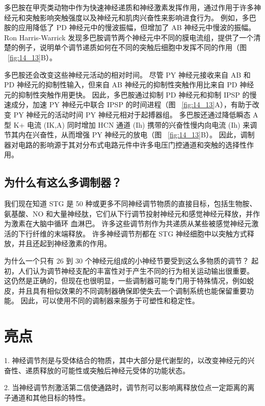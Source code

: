 多巴胺在甲壳类动物中作为快速神经递质和神经激素发挥作用，通过作用于许多神经元和突触影响突触强度以及神经元和肌肉兴奋性来影响进食行为。
例如，多巴胺的应用降低了 PD 神经元中的慢波振幅，但增加了 AB 神经元中慢波的振幅。
Ron Harris-Warrick 发现多巴胺调节两个神经元中不同的膜电流组，提供了一个清楚的例子，说明单个调节递质如何在不同的突触后细胞中发挥不同的作用（图 ~\ref{fig:14_13}B）。


多巴胺还会改变这些神经元活动的相对时间。
尽管 PY 神经元接收来自 AB 和 PD 神经元的抑制性输入，但来自 AB 神经元的抑制性突触作用比来自 PD 神经元的抑制性突触作用更快。
因此，多巴胺通过抑制 PD 神经元和抑制 IPSP 的慢速成分，加速 PY 神经元中联合 IPSP 的时间进程（图 ~\ref{fig:14_13}A），有助于改变 PY 神经元的活动时间 PY 神经元相对于起搏器组。
多巴胺还通过降低瞬态 A 型 K+ 电流 (IK,A) 同时增加 HCN 通道 (Ih) 携带的兴奋性慢内向电流 (Ih) 来调节其内在兴奋性，从而增强 PY 神经元的放电（图 ~\ref{fig:14_13}B）。
因此，调制器对电路的影响源于其对分布式电路元件中许多电压门控通道和突触的选择性作用。



\subsection{为什么有这么多调制器？}

我们现在知道 STG 是 50 种或更多不同神经调节物质的直接目标，包括生物胺、氨基酸、NO 和大量神经肽，它们从下行调节投射神经元和感觉神经元释放，并作为激素在大脑中循环 血淋巴。
许多这些调节剂作为共递质从某些被感觉神经元激活的下行纤维的末端释放。
许多神经调节剂都在 STG 神经细胞中以突触方式释放，并且还起到神经激素的作用。


为什么一个只有 26 到 30 个神经元组成的小神经节要受到这么多物质的调节？
起初，人们认为调节神经支配的丰富性对于产生不同的行为相关运动输出很重要。
这仍然是正确的，但现在也很明显，一些调制器可能专门用于特殊情况，例如蜕皮，并且具有相似效果的不同调制器确保即使失去一个调制系统也能保留重要功能。
因此，可以使用不同的调制器来服务于可塑性和稳定性。



\section{亮点}

1. 神经调节剂是与受体结合的物质，其中大部分是代谢型的，以改变神经元的兴奋性、递质释放的可能性或突触后神经元受体的功能状态。


2. 当神经调节剂激活第二信使通路时，调节剂可以影响离释放位点一定距离的离子通道和其他目标的特性。


